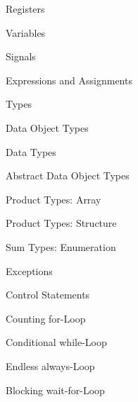 \def\tocXVI{Registers}
{\bf{\parbox{0.95\textwidth}{\hskip20pt\tocXVI\dotfill\pageref{toclabelXVI}}}}\vskip5pt

\def\tocXVII{Variables}
{\bf{\parbox{0.95\textwidth}{\hskip20pt\tocXVII\dotfill\pageref{toclabelXVII}}}}\vskip5pt

\def\tocXVIII{Signals}
{\bf{\parbox{0.95\textwidth}{\hskip20pt\tocXVIII\dotfill\pageref{toclabelXVIII}}}}\vskip5pt

\def\tocXIX{Expressions and Assignments}
{\bf{\parbox{0.95\textwidth}{\hskip10pt\tocXIX\dotfill\pageref{toclabelXIX}}}}\vskip5pt

\def\tocXX{Types}
{\bf{\parbox{0.95\textwidth}{\hskip10pt\tocXX\dotfill\pageref{toclabelXX}}}}\vskip5pt

\def\tocXXI{Data Object Types}
{\bf{\parbox{0.95\textwidth}{\hskip20pt\tocXXI\dotfill\pageref{toclabelXXI}}}}\vskip5pt

\def\tocXXII{Data Types}
{\bf{\parbox{0.95\textwidth}{\hskip20pt\tocXXII\dotfill\pageref{toclabelXXII}}}}\vskip5pt

\def\tocXXIII{Abstract Data Object Types}
{\bf{\parbox{0.95\textwidth}{\hskip20pt\tocXXIII\dotfill\pageref{toclabelXXIII}}}}\vskip5pt

\def\tocXXIV{Product Types: Array}
{\bf{\parbox{0.95\textwidth}{\hskip20pt\tocXXIV\dotfill\pageref{toclabelXXIV}}}}\vskip5pt

\def\tocXXV{Product Types: Structure}
{\bf{\parbox{0.95\textwidth}{\hskip20pt\tocXXV\dotfill\pageref{toclabelXXV}}}}\vskip5pt

\def\tocXXVI{Sum Types: Enumeration}
{\bf{\parbox{0.95\textwidth}{\hskip20pt\tocXXVI\dotfill\pageref{toclabelXXVI}}}}\vskip5pt

\def\tocXXVII{Exceptions}
{\bf{\parbox{0.95\textwidth}{\hskip20pt\tocXXVII\dotfill\pageref{toclabelXXVII}}}}\vskip5pt

\def\tocXXVIII{Control Statements}
{\bf{\parbox{0.95\textwidth}{\hskip10pt\tocXXVIII\dotfill\pageref{toclabelXXVIII}}}}\vskip5pt

\def\tocXXIX{Counting for-Loop}
{\bf{\parbox{0.95\textwidth}{\hskip20pt\tocXXIX\dotfill\pageref{toclabelXXIX}}}}\vskip5pt

\def\tocXXX{Conditional while-Loop}
{\bf{\parbox{0.95\textwidth}{\hskip20pt\tocXXX\dotfill\pageref{toclabelXXX}}}}\vskip5pt

\def\tocXXXI{Endless always-Loop}
{\bf{\parbox{0.95\textwidth}{\hskip20pt\tocXXXI\dotfill\pageref{toclabelXXXI}}}}\vskip5pt

\def\tocXXXII{Blocking wait-for-Loop}
{\bf{\parbox{0.95\textwidth}{\hskip20pt\tocXXXII\dotfill\pageref{toclabelXXXII}}}}\vskip5pt

